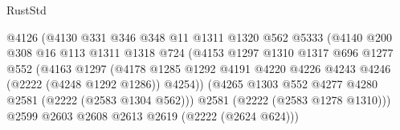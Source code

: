 \begin{lexlean}{RustStd}
\begin{coremodule}
                                      @4126
                                      (@4130
                                        @331
                                        @346
                                        @348
                                        @11
                                        @1311
                                        @1320
                                        @562
                                        @5333
                                        (@4140
                                          @200
                                          @308
                                          @16
                                          @113
                                          @1311
                                          @1318
                                          @724
                                          (@4153
                                            @1297
                                            @1310
                                            @1317
                                            @696
                                            @1277
                                            @552
                                            (@4163
                                              @1297
                                              (@4178
                                                @1285
                                                @1292
                                                @4191
                                                @4220
                                                @4226
                                                @4243
                                                @4246
                                                (@2222 (@4248 @1292 @1286))
                                                @4254))
                                            (@4265
                                              @1303
                                              @552
                                              @4277
                                              @4280
                                              @2581
                                              (@2222 (@2583 @1304 @562)))
                                            @2581
                                            (@2222 (@2583 @1278 @1310)))
                                          @2599
                                          @2603
                                          @2608
                                          @2613
                                          @2619
                                          (@2222 (@2624 @624)))

\end{coremodule}
\end{lexlean}
